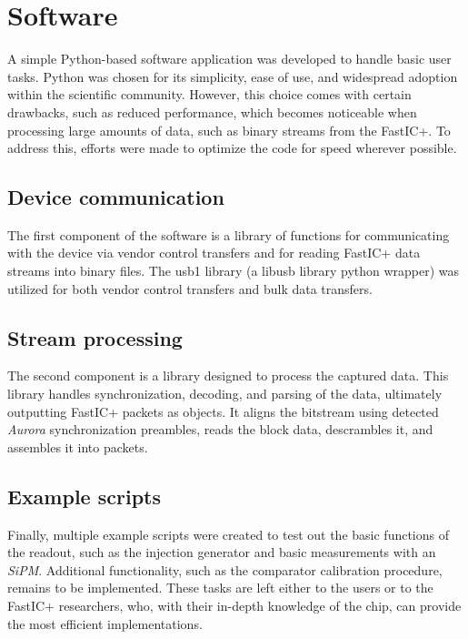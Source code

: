 \chapter{Software}
A simple Python-based software application was developed to handle basic user tasks. Python was chosen for its simplicity, ease of use, and widespread adoption within the scientific community. However, this choice comes with certain drawbacks, such as reduced performance, which becomes noticeable when processing large amounts of data, such as binary streams from the FastIC+. To address this, efforts were made to optimize the code for speed wherever possible.
\section{Device communication}
The first component of the software is a library of functions for communicating with the device via vendor control transfers and for reading FastIC+ data streams into binary files. The usb1 library (a libusb library python wrapper) was utilized for both vendor control transfers and bulk data transfers. \cite{wojtacz_fastic_readout_sw}

\section{Stream processing}
The second component is a library designed to process the captured data. This library handles synchronization, decoding, and parsing of the data, ultimately outputting FastIC+ packets as objects. It aligns the bitstream using detected \emph{Aurora} synchronization preambles, reads the block data, descrambles it, and assembles it into packets. \cite{wojtacz_fastic_readout_sw}

\section{Example scripts}
Finally, multiple example scripts were created to test out the basic functions of the readout, such as the injection generator and basic measurements with an \emph{SiPM}. Additional functionality, such as the comparator calibration procedure, remains to be implemented. These tasks are left either to the users or to the FastIC+ researchers, who, with their in-depth knowledge of the chip, can provide the most efficient implementations. \cite{wojtacz_fastic_readout_sw}
